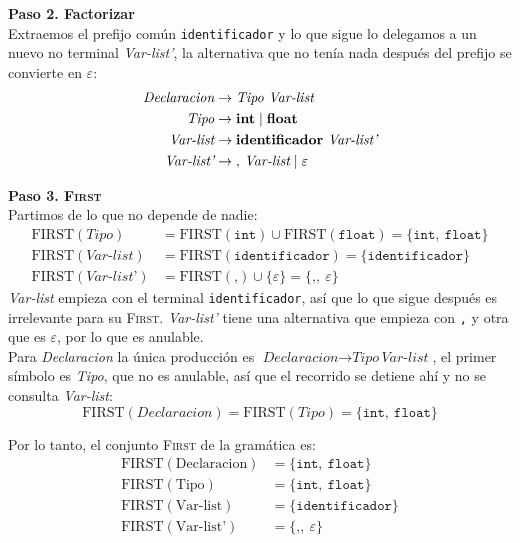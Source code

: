 \documentclass[12pt,letterpaper]{article}
\newcommand{\nt}[1]{\textit{#1}}
\newcommand{\tk}[1]{\texttt{#1}}
\newcommand{\tx}[1]{\text{#1}}
\newcommand{\First}[1]{\mathrm{FIRST}(#1)}
\newcommand{\eps}{\varepsilon}
\begin{document}
\begin{enumerate}[label=\arabic*.]
  \textbf{Paso 2. Factorizar}\\
  Extraemos el prefijo común \tk{identificador} y lo que sigue lo delegamos a un nuevo no terminal
  \nt{Var-list'}, la alternativa que no tenía nada después del prefijo se convierte en $\eps$:
  \[
  \begin{aligned}
    \nt{Declaracion} &\to \nt{Tipo}\ \nt{Var-list} \\
    \nt{Tipo}        &\to \bf{int} \mid \bf{float} \\
    \nt{Var-list}    &\to \bf{identificador}\ \nt{Var-list'} \\
    \nt{Var-list'}   &\to \bf{,}\ \nt{Var-list} \mid \eps
  \end{aligned}
  \]

  \bigskip
  
  \textbf{Paso 3. \textsc{First}}\\
  Partimos de lo que no depende de nadie:
  \[
  \begin{aligned}
    \First{\nt{Tipo}}      &= \First{\tk{int}} \cup \First{\tk{float}} = \{\tk{int},\ \tk{float}\} \\
    \First{\nt{Var-list}}  &= \First{\tk{identificador}} = \{\tk{identificador}\} \\
    \First{\nt{Var-list'}} &= \First{\tk{,}} \cup \{\eps\} = \{\tk{,},\ \eps\}
  \end{aligned}
  \]
  \nt{Var-list} empieza con el terminal \tk{identificador}, así que lo que sigue después es irrelevante
  para su \textsc{First}. \nt{Var-list'} tiene una alternativa que empieza con \tk{,} y otra que es $\eps$,
  por lo que es anulable.\\

  Para \nt{Declaracion} la única producción es $\nt{Declaracion}\to\nt{Tipo}\,\nt{Var-list}$, el primer
  símbolo es \nt{Tipo}, que no es anulable, así que el recorrido se detiene ahí y no se consulta \nt{Var-list}:
  \[
  \First{\nt{Declaracion}} = \First{\nt{Tipo}} = \{\tk{int},\ \tk{float}\}
  \]

  Por lo tanto, el conjunto \textsc{First} de la gramática es:
  \[
  \begin{aligned}
    \First{\tx{Declaracion}} &= \{\tk{int},\ \tk{float}\} \\
    \First{\tx{Tipo}}        &= \{\tk{int},\ \tk{float}\} \\
    \First{\tx{Var-list}}    &= \{\tk{identificador}\} \\
    \First{\tx{Var-list'}}   &= \{\tk{,},\ \eps\}
  \end{aligned}
  \]


\end{enumerate}
\end{document}
